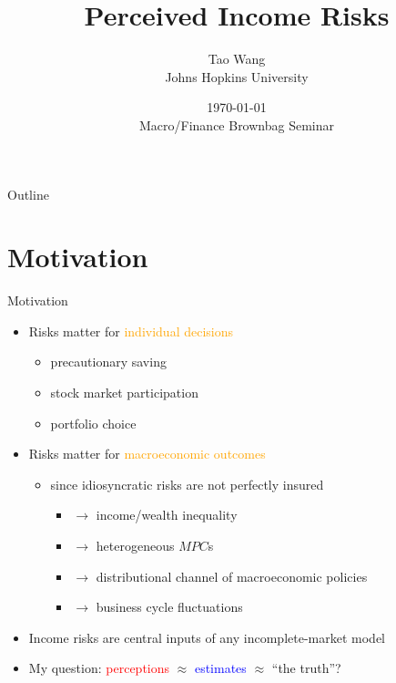 \documentclass{beamer}
\title{Perceived Income Risks}
\author{Tao Wang \\ Johns Hopkins University}
\date{\today \\
	Macro/Finance Brownbag Seminar}
\begin{document}
	

\begin{frame}
	\titlepage
\end{frame}
\begin{frame}{Outline}
	\tableofcontents
\end{frame}


\section{Motivation}


\begin{frame}{Motivation}
	\begin{itemize}
		\item Risks matter for \textcolor{orange}{individual decisions}
		\begin{itemize}
			\item precautionary saving 
			\item stock market participation
			\item portfolio choice 
		\end{itemize} 
		\item Risks matter for \textcolor{orange}{macroeconomic outcomes}
		\begin{itemize}
			\item since idiosyncratic risks are not perfectly insured 
			\begin{itemize}
				\item $\rightarrow$ income/wealth inequality 
				\item $\rightarrow$ heterogeneous $MPC$s
				\item $\rightarrow$ distributional channel of macroeconomic policies 
				\item $\rightarrow$ business cycle fluctuations
			\end{itemize}
		\end{itemize}  %
	\item Income risks are central inputs of any incomplete-market model   
		\item My question:  \textcolor{red}{perceptions} $\approx$ \textcolor{blue}{estimates}  $\approx$  ``the truth''?  %
	\end{itemize}
\end{frame}
\end{document}
